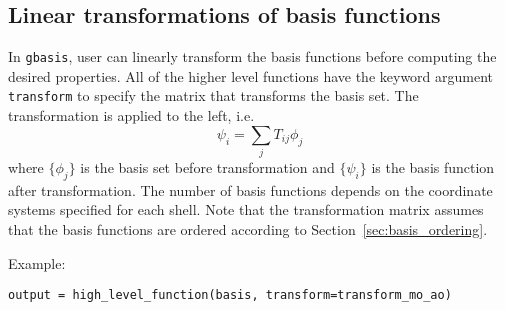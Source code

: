 \documentclass[letterpaper]{article}
\begin{document}
\subsection{Linear transformations of basis functions}
In \verb|gbasis|, user can linearly transform the basis functions before
computing the desired properties.
All of the higher level functions have the keyword argument \verb|transform| to
specify the matrix that transforms the basis set.
The transformation is applied to the left, i.e.
\begin{equation}
 \psi_i = \sum_j T_{ij} \phi_j
\end{equation}
where $\{\phi_j\}$ is the basis set before transformation and $\{\psi_i\}$ is
the basis function after transformation.
The number of basis functions depends on the coordinate systems specified for
each shell.
Note that the transformation matrix assumes that the basis functions are ordered
according to Section~\ref{sec:basis_ordering}.

Example:
\begin{lstlisting}
output = high_level_function(basis, transform=transform_mo_ao)
\end{lstlisting}
\end{document}
